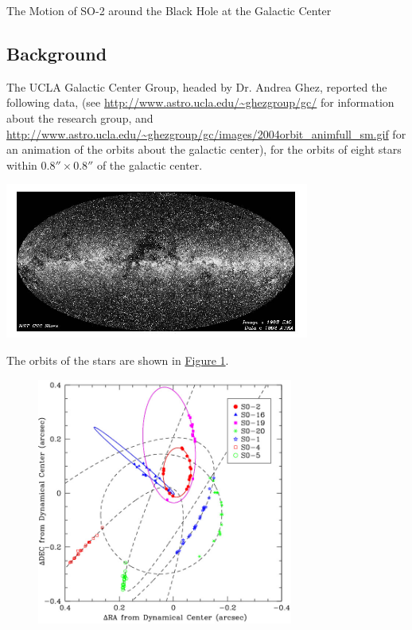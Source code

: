 \documentclass{esg8012pset}
\begin{document}
\begin{solution}
\begin{problem}{The Motion of SO-2 around the Black Hole at the Galactic Center}
  \subsection{Background}
    The UCLA Galactic Center Group, headed by Dr. Andrea Ghez, reported the following data, (see \url{http://www.astro.ucla.edu/\~ghezgroup/gc/} for information about the research group, and \url{http://www.astro.ucla.edu/\~ghezgroup/gc/images/2004orbit_animfull_sm.gif} for an animation of the orbits about the galactic center), for the orbits of eight stars within $0.8'' \times 0.8''$ of the galactic center.
    \begin{center}\includegraphics[width=0.75\textwidth]{ps10_3}\end{center}
    The orbits of the stars are shown in \hyperref[fig:orbits]{Figure 1}.
    
    \begin{figure}[!h] \label{fig:orbits}
      \begin{center}\includegraphics[width=0.75\textwidth]{ps10_4}\end{center}
    \end{figure}
    

\end{problem}
\end{solution}
\end{document}
